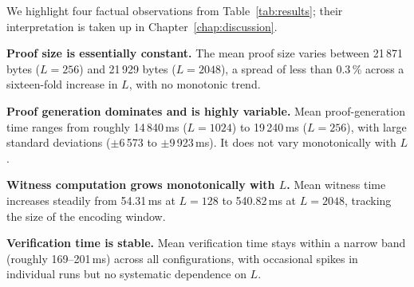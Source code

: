 We highlight four factual observations from Table~\ref{tab:results}; their interpretation is taken up in Chapter~\ref{chap:discussion}.

\medskip

\textbf{Proof size is essentially constant.} The mean proof size varies between 21\,871 bytes ($L = 256$) and 21\,929 bytes ($L = 2048$), a spread of less than 0.3\,\% across a sixteen-fold increase in $L$, with no monotonic trend.

\medskip

\textbf{Proof generation dominates and is highly variable.} Mean proof-generation time ranges from roughly 14\,840\,ms ($L = 1024$) to 19\,240\,ms ($L = 256$), with large standard deviations ($\pm$6\,573 to $\pm$9\,923\,ms). It does not vary monotonically with $L$.

\medskip

\textbf{Witness computation grows monotonically with $L$.} Mean witness time increases steadily from 54.31\,ms at $L = 128$ to 540.82\,ms at $L = 2048$, tracking the size of the encoding window.

\medskip

\textbf{Verification time is stable.} Mean verification time stays within a narrow band (roughly 169--201\,ms) across all configurations, with occasional spikes in individual runs but no systematic dependence on $L$.
